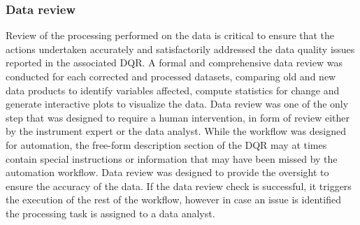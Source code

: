 \subsubsection{Data review}
Review of the processing performed on the data is critical to ensure
that the actions undertaken accurately and satisfactorily addressed the
data quality issues reported in the associated DQR.
A formal and comprehensive data review was conducted for each corrected
and processed datasets,
comparing old and new data products to identify variables
affected, compute statistics for change and generate interactive plots
to visualize the data. Data review was one of the only step that was
designed to require a human intervention, in form of review either by
the instrument expert or the data analyst. While the workflow was
designed for automation, the free-form description section of the DQR
may at times contain special instructions or information that may have been missed by the
automation workflow. Data review was designed to provide the oversight
to ensure the accuracy of the data. If the data review check is
successful, it triggers the execution of the rest of the workflow,
however in case an issue is identified the processing task is
assigned to a data analyst. 




